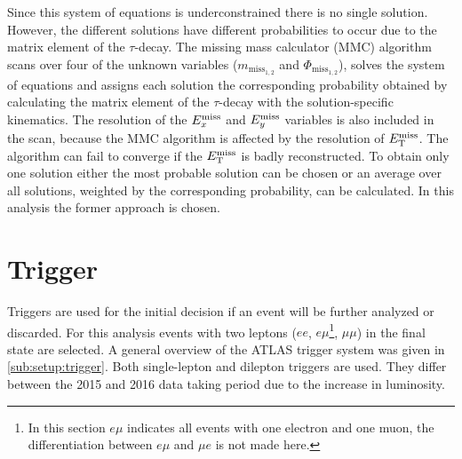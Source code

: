 Since this system of equations is underconstrained there is no single solution.
However, the different solutions have different probabilities to occur due to the matrix element of the $\tau$-decay.
The missing mass calculator (MMC) algorithm~\cite{MMC} scans over four of the unknown variables ($m_{\text{miss}_{1,2}}$ and $\Phi_{\text{miss}_{1,2}}$),
solves the system of equations and assigns each solution the corresponding probability obtained by calculating the matrix
element of the $\tau$-decay with the solution-specific kinematics.
The resolution of the $E_x^\text{miss}$ and $E_y^\text{miss}$ variables is also included in the scan, because the MMC algorithm
is affected by the resolution of $E_\text{T}^\text{miss}$.
The algorithm can fail to converge if the $E_\text{T}^\text{miss}$ is badly reconstructed.
To obtain only one solution either the most probable solution can be chosen or an average over all solutions,
weighted by the corresponding probability, can be calculated.
In this analysis the former approach is chosen.


\section{Trigger}\label{sec:event_selection:trigger}

Triggers are used for the initial decision if an event will be further analyzed or discarded.
For this analysis events with two leptons ($ee$, $e\mu$\footnote{In this section $e\mu$ indicates all events
with one electron and one muon, the differentiation between $e\mu$ and $\mu e$ is not made here.}, $\mu\mu$) in the final state are selected.
A general overview of the ATLAS trigger system was given in \cref{sub:setup:trigger}.
Both single-lepton and dilepton triggers are used.
They differ between the 2015 and 2016 data taking period due to the increase in luminosity.

